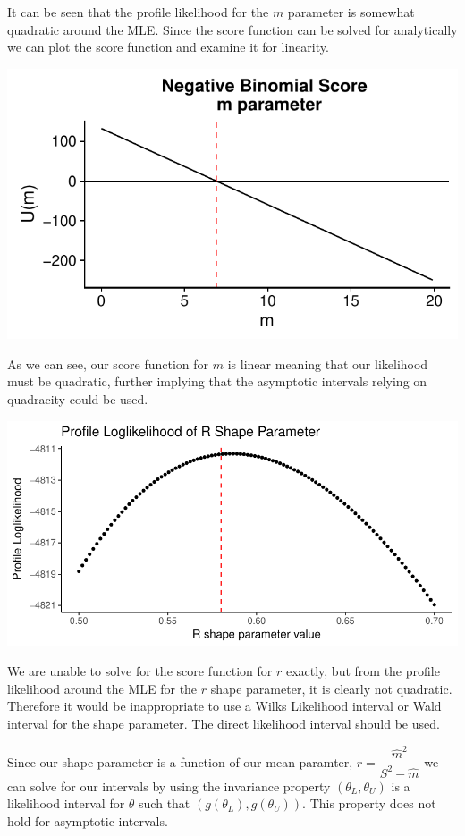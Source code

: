 \documentclass[11pt,preprint, authoryear]{elsarticle}
\numberwithin{equation}{section}
\numberwithin{figure}{section}
\numberwithin{table}{section}
\begin{document}
It can be seen that the profile likelihood for the \(m\) parameter is
somewhat quadratic around the MLE. Since the score function can be
solved for analytically we can plot the score function and examine it
for linearity.

\includegraphics{likelihood_files/figure-latex/unnamed-chunk-6-1.pdf}

As we can see, our score function for \(m\) is linear meaning that our
likelihood must be quadratic, further implying that the asymptotic
intervals relying on quadracity could be used.

\includegraphics{likelihood_files/figure-latex/profile_likelihood_r-1.pdf}

We are unable to solve for the score function for \(r\) exactly, but
from the profile likelihood around the MLE for the \(r\) shape
parameter, it is clearly not quadratic. Therefore it would be
inappropriate to use a Wilks Likelihood interval or Wald interval for
the shape parameter. The direct likelihood interval should be used.

Since our shape parameter is a function of our mean paramter,
\(\hat{r} = \dfrac{\hat{m}^2}{S^2 - \hat{m}}\) we can solve for our
intervals by using the invariance property \((\theta_L,\theta_U)\) is a
likelihood interval for \(\theta\) such that
\((g(\theta_L),g(\theta_U))\). This property does not hold for
asymptotic intervals.
\end{document}

